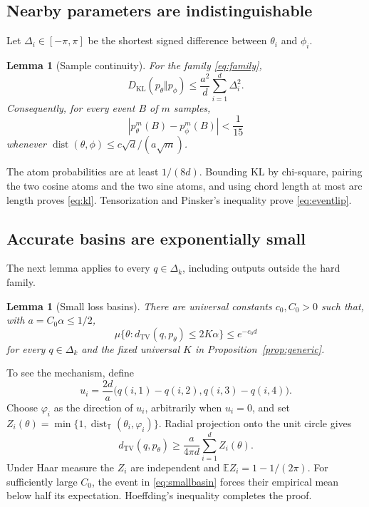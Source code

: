 \documentclass[twoside]{article}
\newtheorem{lemma}[theorem]{Lemma}
\theoremstyle{definition}
\newcommand{\E}{\mathbb E}
\newcommand{\T}{\mathbb T}
\newcommand{\TV}{d_{\mathrm{TV}}}
\newcommand{\KL}{D_{\mathrm{KL}}}
\newcommand{\1}{\mathbf 1}
\newcommand{\dist}{\operatorname{dist}}
\begin{document}
\subsection{Nearby parameters are indistinguishable}

Let $\Delta_i\in[-\pi,\pi]$ be the shortest signed difference between $\theta_i$ and $\phi_i$.

\begin{lemma}[Sample continuity]\label{lem:kl}
For the family \eqref{eq:family},
\begin{equation}
 \KL(p_\theta\Vert p_\phi)
 \le \frac{a^2}{d}\sum_{i=1}^d\Delta_i^2.
 \label{eq:kl}
\end{equation}
Consequently, for every event $B$ of $m$ samples,
\begin{equation}
 |p_\theta^m(B)-p_\phi^m(B)|<\frac1{15}
 \label{eq:eventlip}
\end{equation}
whenever $\dist(\theta,\phi)\le c\sqrt d/(a\sqrt m)$.
\end{lemma}

The atom probabilities are at least $1/(8d)$. Bounding KL by chi-square, pairing the two cosine atoms and the two sine atoms, and using chord length at most arc length proves \eqref{eq:kl}. Tensorization and Pinsker's inequality prove \eqref{eq:eventlip}.

\subsection{Accurate basins are exponentially small}

The next lemma applies to every $q\in\Delta_k$, including outputs outside the hard family.

\begin{lemma}[Small loss basins]\label{lem:basin}
There are universal constants $c_0,C_0>0$ such that, with $a=C_0\alpha\le1/2$,
\begin{equation}
 \mu\{\theta:\TV(q,p_\theta)\le2K\alpha\}
 \le e^{-c_0d}
 \label{eq:smallbasin}
\end{equation}
for every $q\in\Delta_k$ and the fixed universal $K$ in Proposition~\ref{prop:generic}.
\end{lemma}

To see the mechanism, define \[ u_i=\frac{2d}{a}\big(q(i,1)-q(i,2), q(i,3)-q(i,4)\big). \] Choose $\varphi_i$ as the direction of $u_i$, arbitrarily when $u_i=0$, and set $Z_i(\theta)=\min\{1,\dist_{\T}(\theta_i,\varphi_i)\}$. Radial projection onto the unit circle gives
\begin{equation}
 \TV(q,p_\theta)
 \ge \frac{a}{4\pi d}\sum_{i=1}^d Z_i(\theta).
 \label{eq:decode}
\end{equation}
Under Haar measure the $Z_i$ are independent and $\E Z_i=1-1/(2\pi)$. For sufficiently large $C_0$, the event in \eqref{eq:smallbasin} forces their empirical mean below half its expectation. Hoeffding's inequality completes the proof.
\end{document}
